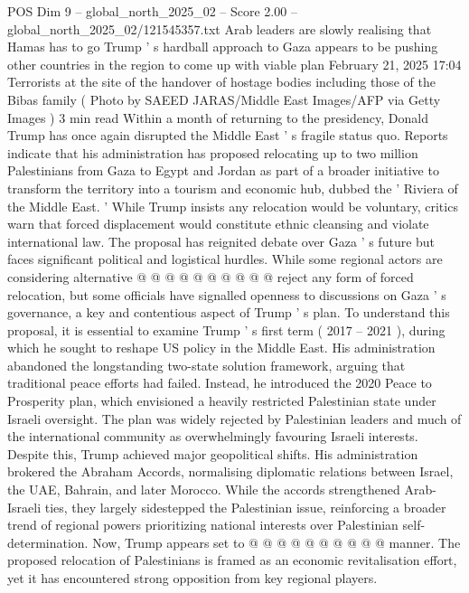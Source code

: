 \begin{textsample}{POS Dim 9 – global\_north\_2025\_02 – Score 2.00 – global\_north\_2025\_02/121545357.txt}  \label{ex:f9_pos_386}
Arab leaders are slowly realising that Hamas has to go Trump ' s hardball approach to Gaza appears to be pushing other countries in the region to come up with viable plan February 21, 2025 17:04 Terrorists at the site of the handover of hostage bodies including those of the Bibas family ( Photo by SAEED JARAS/Middle East Images/AFP via Getty Images ) 3 min read Within a month of returning to the presidency, Donald Trump has once again disrupted the Middle East ' s fragile status quo.
Reports indicate that his administration has proposed relocating up to two million Palestinians from Gaza to Egypt and Jordan as part of a broader initiative to transform the territory into a tourism and economic hub, dubbed the ' Riviera of the Middle East. ' While Trump insists any relocation would be voluntary, critics warn that forced displacement would constitute ethnic cleansing and violate international law.
The proposal has reignited debate over Gaza ' s future but faces significant political and logistical hurdles.
While some regional actors are considering alternative @ @ @ @ @ @ @ @ @ @ reject any form of forced relocation, but some officials have signalled openness to discussions on Gaza ' s governance, a key and contentious aspect of Trump ' s plan.
To understand this proposal, it is essential to examine Trump ' s first term ( 2017 -- 2021 ), during which he sought to reshape US policy in the Middle East.
His administration abandoned the longstanding two-state solution framework, arguing that traditional peace efforts had failed.
Instead, he introduced the 2020 Peace to Prosperity plan, which envisioned a heavily restricted Palestinian state under Israeli oversight.
The plan was widely rejected by Palestinian leaders and much of the international community as overwhelmingly favouring Israeli interests.
Despite this, Trump achieved major geopolitical shifts.
His administration brokered the Abraham Accords, normalising diplomatic relations between Israel, the UAE, Bahrain, and later Morocco.
While the accords strengthened Arab-Israeli ties, they largely sidestepped the Palestinian issue, reinforcing a broader trend of regional powers prioritizing national interests over Palestinian self-determination.
Now, Trump appears set to @ @ @ @ @ @ @ @ @ @ manner.
The proposed relocation of Palestinians is framed as an economic revitalisation effort, yet it has encountered strong opposition from key regional players.

\end{textsample}
